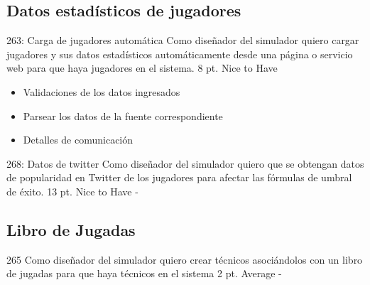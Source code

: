 \vspace{1cm}

\subsection{Datos estadísticos de jugadores}

\simplestory
{263: Carga de jugadores automática}
{Como diseñador del simulador quiero cargar jugadores y sus datos estadísticos automáticamente desde una página o servicio web para que haya jugadores en el sistema.}
{8 pt.}
{Nice to Have}
{\begin{itemize}
\item Validaciones de los datos ingresados
\item Parsear los datos de la fuente correspondiente
\item Detalles de comunicación
\end{itemize}}

\vspace{1cm}

\simplestory
{268: Datos de twitter}
{Como diseñador del simulador quiero que se obtengan datos de popularidad en Twitter de los jugadores para afectar las fórmulas de umbral de éxito.}
{13 pt.}
{Nice to Have}
{-}

\vspace{1cm}

\subsection{Libro de Jugadas}
\simplestory
{265}
{Como diseñador del simulador quiero crear técnicos asociándolos con un libro de jugadas para que haya técnicos en el sistema}
{2 pt.}
{Average}
{-}

\vspace{1cm}
